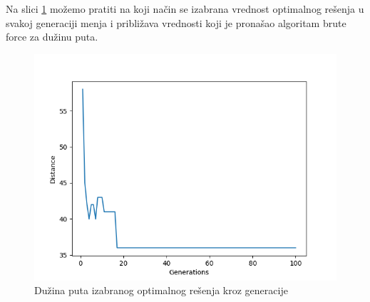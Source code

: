\documentclass[a4paper]{article}
\begin{document}
\newpage
Na slici \ref{fig:pande} možemo pratiti na koji način se izabrana vrednost optimalnog rešenja u svakoj generaciji menja i približava vrednosti koji je pronašao algoritam brute force za dužinu puta.

\begin{figure}[h!]
\begin{center}
\includegraphics[scale=0.40]{1.png}
\end{center}
\caption{Dužina puta izabranog optimalnog rešenja kroz generacije}
\label{fig:pande}
\end{figure}
\end{document}

